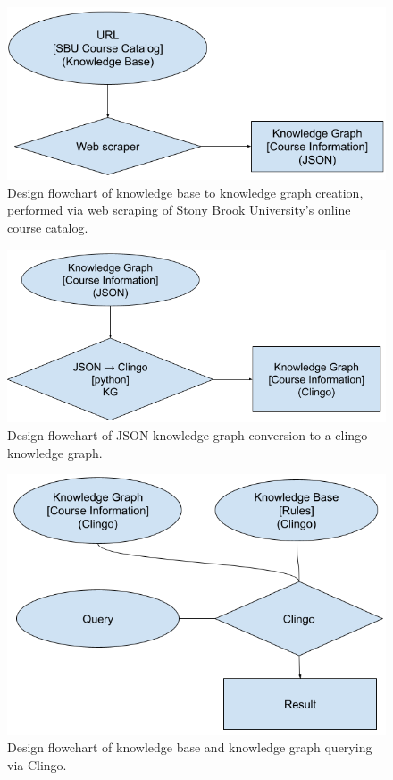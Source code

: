 \documentclass[12pt]{article}
\begin{document}
    \begin{figure}
        \centering
        \includegraphics[scale=0.5]{figures/design/kb_to_kg_json.png}
        \caption{Design flowchart of knowledge base to knowledge graph creation, performed via web scraping of Stony Brook University's online course catalog.}
        \label{fig:kb-kg}
    \end{figure}

    \begin{figure}
        \centering
        \includegraphics[scale=0.5]{figures/design/json_to_clingo_kg.png}
        \caption{Design flowchart of JSON knowledge graph conversion to a clingo knowledge graph.}
        \label{fig:kg-clingo}
    \end{figure}

    \begin{figure}
        \centering
        \includegraphics[scale=0.5]{figures/design/kg_kb_query.png}
        \caption{Design flowchart of knowledge base and knowledge graph querying via Clingo.}
        \label{fig:kb-query}
    \end{figure}
    
\end{document}
